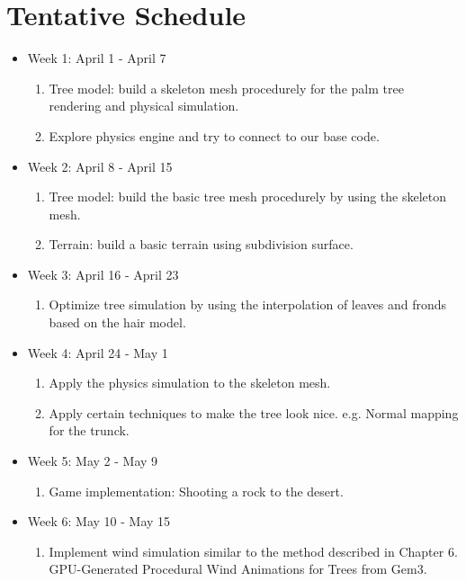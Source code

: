 \documentclass[11pt]{article}
\begin{document}
\section{Tentative Schedule}
\begin{itemize}
\item{Week 1: April 1 - April 7}

\begin{enumerate}
\item{Tree model: build a skeleton mesh procedurely for the palm tree rendering and physical simulation.}
\item{Explore physics engine and try to connect to our base code.}
\end{enumerate}

\item{Week 2: April 8 - April 15}

\begin{enumerate}
\item{Tree model: build the basic tree mesh procedurely by using the skeleton mesh.}
\item{Terrain: build a basic terrain using subdivision surface.}

\end{enumerate}

\item{Week 3: April 16 - April 23}

\begin{enumerate}
\item{Optimize tree simulation by using the interpolation of leaves and fronds based on the hair model.}

\end{enumerate}

\item{Week 4: April 24 - May 1}

\begin{enumerate}
\item{Apply the physics simulation to the skeleton mesh.}
\item{Apply certain techniques to make the tree look nice. e.g. Normal mapping for the trunck.}
\end{enumerate}

\item{Week 5: May 2 - May 9}

\begin{enumerate}
\item{Game implementation: Shooting a rock to the desert.}

\end{enumerate}

\item{Week 6: May 10 - May 15}

\begin{enumerate}
\item{Implement wind simulation similar to the method described in Chapter 6. GPU-Generated Procedural Wind Animations for Trees from Gem3. }
\end{enumerate}

\end{itemize}
\end{document}
